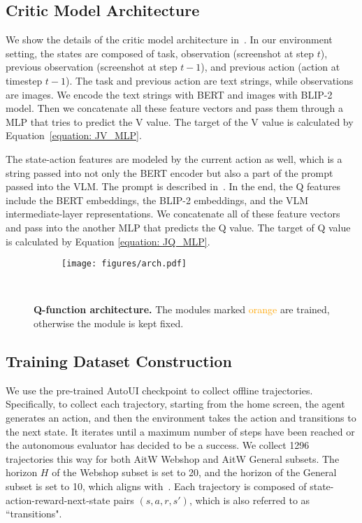 \subsection{Critic Model Architecture} \label{app: arch}

We show the details of the critic model architecture in~. In our environment setting, the states are composed of task, observation (screenshot at step $t$), previous observation (screenshot at step $t-1$), and previous action (action at timestep $t-1$). The task and previous action are text strings, while observations are images. We encode the text strings with BERT and images with BLIP-2 model. Then we concatenate all these feature vectors and pass them through a MLP that tries to predict the V value. The target of the V value is calculated by Equation~\ref{equation: JV_MLP}.

The state-action features are modeled by the current action as well, which is a string passed into not only the BERT encoder but also a part of the prompt passed into the VLM. The prompt is described in~. In the end, the Q features include the BERT embeddings, the BLIP-2 embeddings, and the VLM intermediate-layer representations. We concatenate all of these feature vectors and pass into the another MLP that predicts the Q value. The target of Q value is calculated by Equation \ref{equation: JQ_MLP}.

\begin{figure}[!t]
     \centering
    \begin{subfigure}[b]{1.0\textwidth}
         \centering
    \texttt{[image: figures/arch.pdf]}
     \end{subfigure}
     ~\vspace{-0.2cm}
        \caption{\textbf{Q-function architecture.} The modules marked \textcolor{orange}{orange} are trained, otherwise the module is kept fixed.}
        \label{fig:arch}
\end{figure}

\subsection{Training Dataset Construction} \label{app:offline-dataset-construction}

We use the pre-trained AutoUI checkpoint to collect offline trajectories. Specifically, to collect each trajectory, starting from the home screen, the agent generates an action, and then the environment takes the action and transitions to the next state. It iterates until a maximum number of steps have been reached or the autonomous evaluator has decided to be a success. We collect 1296 trajectories this way for both AitW Webshop and AitW General subsets. The horizon $H$ of the Webshop subset is set to 20, and the horizon of the General subset is set to 10, which aligns with~\citep{bai2024digirltraininginthewilddevicecontrol}. Each trajectory is composed of state-action-reward-next-state pairs $(s, a, r, s')$, which is also referred to as ``transitions".

